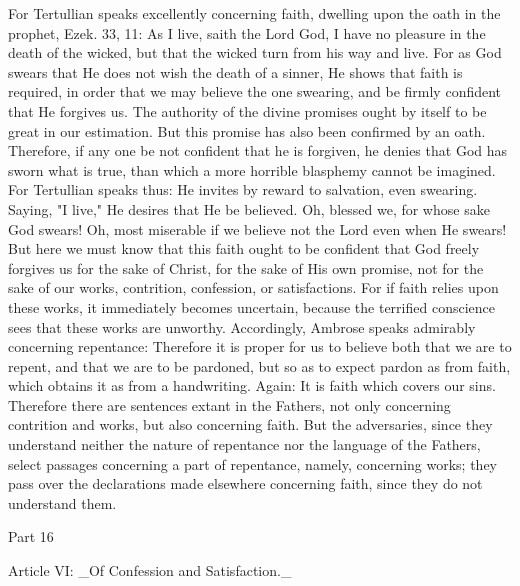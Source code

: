 For Tertullian speaks excellently concerning faith, dwelling upon the
oath in the prophet, Ezek. 33, 11: As I live, saith the Lord God, I
have no pleasure in the death of the wicked, but that the wicked turn
from his way and live.  For as God swears that He does not wish the
death of a sinner, He shows that faith is required, in order that we
may believe the one swearing, and be firmly confident that He
forgives us.  The authority of the divine promises ought by itself to
be great in our estimation.  But this promise has also been confirmed
by an oath.  Therefore, if any one be not confident that he is
forgiven, he denies that God has sworn what is true, than which a
more horrible blasphemy cannot be imagined.  For Tertullian speaks
thus: He invites by reward to salvation, even swearing.  Saying, "I
live," He desires that He be believed.  Oh, blessed we, for whose
sake God swears!  Oh, most miserable if we believe not the Lord even
when He swears!  But here we must know that this faith ought to be
confident that God freely forgives us for the sake of Christ, for the
sake of His own promise, not for the sake of our works, contrition,
confession, or satisfactions.  For if faith relies upon these works,
it immediately becomes uncertain, because the terrified conscience
sees that these works are unworthy.  Accordingly, Ambrose speaks
admirably concerning repentance: Therefore it is proper for us to
believe both that we are to repent, and that we are to be pardoned,
but so as to expect pardon as from faith, which obtains it as from a
handwriting.  Again: It is faith which covers our sins.  Therefore
there are sentences extant in the Fathers, not only concerning
contrition and works, but also concerning faith.  But the adversaries,
since they understand neither the nature of repentance nor the
language of the Fathers, select passages concerning a part of
repentance, namely, concerning works; they pass over the declarations
made elsewhere concerning faith, since they do not understand them.




Part 16


Article VI: _Of Confession and Satisfaction._

